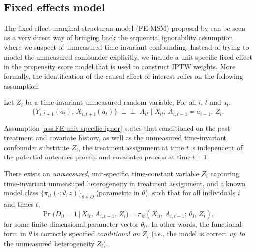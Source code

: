 \subsection{Fixed effects model}
\label{sec:fe-msm}
The fixed-effect marginal structuran model (FE-MSM) proposed 
by \cite{blackwellEffectPoliticalAdvertising2024} 
can be seen as a very direct way of bringing back the sequential 
ignorability assumption where we suspect of unmeasured time-invariant confounding. 
Instead of trying to model the unmeasured confounder explicitly, 
we include a unit-specific fixed effect in the propensity score 
model that is used to construct IPTW weights. More formally, the identification of 
the causal effect of interest relies on the following assumption:
\begin{idassumpFE}\label{ass:FE-unit-specific-ignor}
    Let $Z_i$ be a time-invariant unmeasured random variable, For 
    all $i$, $t$ and $\bar{a}_t$,
    \[
    \{ Y_{i,t+1}(\bar{a}_{t}),\, \bar X_{i,t+1}(\bar a_t) \}
\;\perp\!\!\!\perp\;
A_{it}
\;\big|\;
\bar X_{it},\,
\bar A_{i,t-1} = \bar a_{t-1},\,
Z_i. \]
\end{idassumpFE}

Assumption \ref{ass:FE-unit-specific-ignor} states that conditioned on 
the past treatment and covariate history, as well as 
the unmeasured time-invariant confounder substitute $Z_i$, 
the treatment assignment at time $t$ is independent of 
the potential outcomes process and covariates process at time $t+1$. 

\begin{modassumpFE}
\label{ass:FE-ps-correct}
There exists an \emph{unmeasured}, unit-specific, time-constant variable $Z_i$ capturing
time-invariant unmeasured heterogeneity in treatment assignment, and a known model class
$\{\pi_{it}(\cdot;\theta,z)\}_{\theta\in\Theta}$ (parametric in $\theta$), such that for all individuals $i$
and times $t$,
\[
\Pr\!\bigl(D_{it}=1 \,\big|\, \bar X_{it},\, \bar A_{i,t-1},\, Z_i \bigr)
=
\pi_{it}\!\left(\bar X_{it},\, \bar A_{i,t-1};\, \theta_0,\, Z_i\right),
\]
for some finite-dimensional parameter vector $\theta_0$. In other words, the functional form
in $\theta$ is correctly specified \emph{conditional on} $Z_i$ (i.e., the model is correct \emph{up to}
the unmeasured heterogeneity $Z_i$).
\end{modassumpFE}

